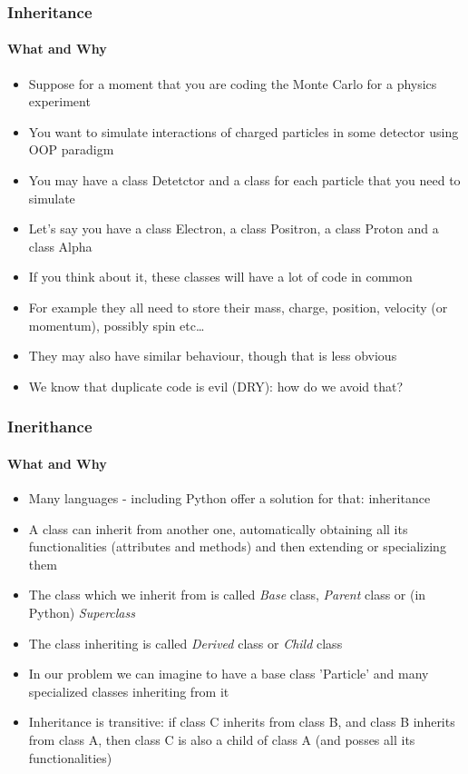 \documentclass[9pt]{beamer}
\begin{document}
\begin{frame}
  \frametitle{Inheritance}
  \framesubtitle{What and Why}

  \begin{itemize}
    \small
    \item Suppose for a moment that you are coding the Monte Carlo for a physics experiment
    \medskip
    \item You want to simulate interactions of charged particles in some detector using OOP paradigm
    \medskip
    \item You may have a class Detetctor and a class for each particle that you need to simulate
    \medskip
    \item Let's say you have a class Electron, a class Positron, a class Proton and a class Alpha
    \medskip
    \item If you think about it, these classes will have a lot of code in common
    \medskip
    \item For example they all need to store their mass, charge, position, velocity (or momentum), possibly spin etc\dots
    \medskip
    \item They may also have similar behaviour, though that is less obvious
    \medskip
    \item We know that duplicate code is evil (DRY): how do we avoid that?
  \end{itemize}

\end{frame}


\begin{frame}
  \frametitle{Inerithance}
  \framesubtitle{What and Why}

  \begin{itemize}
    \small
    \item Many languages - including Python offer a solution for that: \alert{inheritance}
    \medskip
    \item A class can inherit from another one, automatically obtaining all its functionalities (attributes and methods) and then extending or specializing them
    \medskip
    \item The class which we inherit from is called \emph{Base} class, \emph{Parent} class or (in Python) \emph{Superclass}
    \medskip
    \item The class inheriting is called \emph{Derived} class or \emph{Child} class
    \medskip
    \item In our problem we can imagine to have a base class 'Particle' and many specialized classes inheriting from it
    \medskip
    \item Inheritance is transitive: if class C inherits from class B, and class B inherits from class A, then class C is also a child of class A (and posses all its functionalities)
  \end{itemize}

\end{frame}
\end{document}
